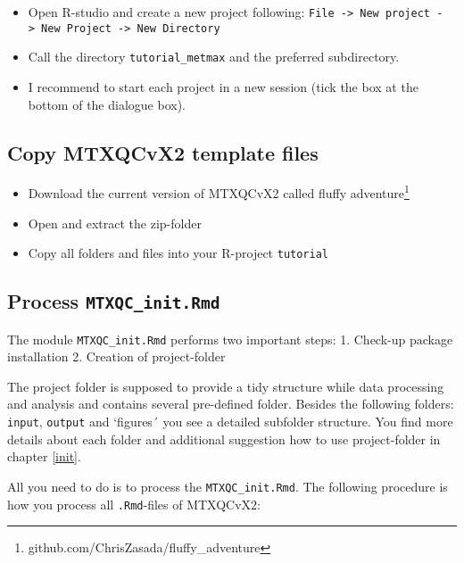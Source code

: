 \documentclass[]{book}
\providecommand{\tightlist}{%
  \setlength{\itemsep}{0pt}\setlength{\parskip}{0pt}}
\let\rmarkdownfootnote\footnote%
\def\footnote{\protect\rmarkdownfootnote}
\begin{document}
\begin{itemize}
\tightlist
\item
  Open R-studio and create a new project following: \texttt{File\ -\textgreater{}\ New\ project\ -\textgreater{}\ New\ Project\ -\textgreater{}\ New\ Directory}
\item
  Call the directory \texttt{tutorial\_metmax} and the preferred subdirectory.
\item
  I recommend to start each project in a new session (tick the box at the bottom of the dialogue box).
\end{itemize}

\hypertarget{copy-mtxqcvx2-template-files-1}{%
\subsection{Copy MTXQCvX2 template files}\label{copy-mtxqcvx2-template-files-1}}

\begin{itemize}
\tightlist
\item
  Download the current version of MTXQCvX2 called fluffy adventure\footnote{github.com/ChrisZasada/fluffy\_adventure}
\item
  Open and extract the zip-folder
\item
  Copy all folders and files into your R-project \texttt{tutorial}
\end{itemize}

\hypertarget{process-mtxqc_init.rmd-1}{%
\subsection{\texorpdfstring{Process \texttt{MTXQC\_init.Rmd}}{Process MTXQC\_init.Rmd}}\label{process-mtxqc_init.rmd-1}}

The module \texttt{MTXQC\_init.Rmd} performs two important steps:
1. Check-up package installation
2. Creation of project-folder

The project folder is supposed to provide a tidy structure while data processing and analysis and contains several pre-defined folder. Besides the following folders: \texttt{input}, \texttt{output} and `figures´ you see a detailed subfolder structure. You find more details about each folder and additional suggestion how to use project-folder in chapter \ref{init}.

All you need to do is to process the \texttt{MTXQC\_init.Rmd}. The following procedure is how you process all \texttt{.Rmd}-files of MTXQCvX2:
\end{document}

